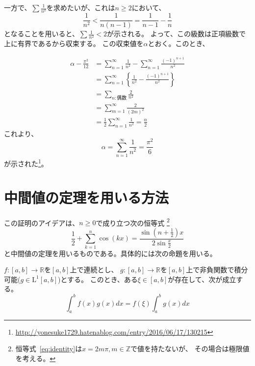 \documentclass{jsarticle}
\begin{document}
一方で、$\sum\frac{1}{n^2}$を求めたいが、これは$n\geq 2$において、
\begin{equation}
	\frac{1}{n^{2}}<\frac{1}{n(n-1)}=\frac{1}{n-1}-\frac{1}{n}
\end{equation}
となることを用いると、$\sum\frac{1}{n^2}<2$が示される。
よって、この級数は正項級数で上に有界であるから収束する。
この収束値を$\alpha$とおく。このとき、

\begin{align}
	\alpha-\frac{\pi^{2}}{12}
	&=\sum_{n=1}^{\infty}\frac{1}{n^2}-\sum_{n=1}^{\infty}\frac{(-1)^{n+1}}{n^{2}}\\
	&=\sum_{n=1}^{\infty}\left\{\frac{1}{n^{2}}-\frac{(-1)^{n+1}}{n^{2}}\right\}\\
	&=\sum_{n:偶数}\frac{2}{n^{2}}\\
	&=\sum_{m=1}^{\infty}\frac{2}{(2m)^{2}}\\
	&=\frac{1}{2}\sum_{n=1}^{\infty}\frac{1}{n^{2}}=\frac{\alpha}{2}
\end{align}
これより、
\begin{equation}
	\alpha=\sum_{n=1}^{\infty}\frac{1}{n^{2}}=\frac{\pi^{2}}{6}
\end{equation}
が示された\footnote{\url{http://yonesuke1729.hatenablog.com/entry/2016/06/17/130215}}。

\newpage

\section{中間値の定理を用いる方法}

この証明のアイデアは、$n\geq 0$で成り立つ次の恒等式
\footnote{恒等式~\eqref{eq:identity}は$x=2m\pi,m\in\mathbb{Z}$で値を持たないが、
その場合は極限値を考える。}
\begin{equation}
	\frac{1}{2}+\sum_{k=1}^{n}\cos(kx)=\frac{\sin\left(n+\frac{1}{2}\right)x}{2\sin\frac{x}{2}}
	\label{eq:identity}
\end{equation}
と中間値の定理を用いるものである。具体的には次の命題を用いる。
\begin{screen}
	$f:[a,b]\to\mathbb{R}$を$[a,b]$上で連続とし、
	$g:[a,b]\to\mathbb{R}$を$[a,b]$上で非負関数で積分可能($g\in\mathrm{L}^{1}[a,b]$)とする。
	このとき、ある$\xi\in[a,b]$が存在して、次が成立する。
	\begin{equation}
		\int_{a}^{b}f(x)g(x)dx=f(\xi)\int_{a}^{b}g(x)dx
	\end{equation}
\end{screen}
\end{document}
